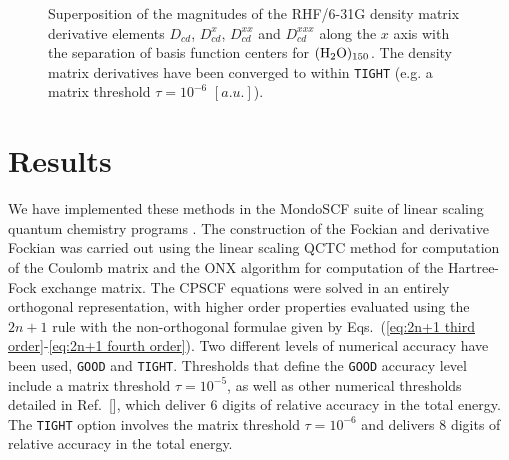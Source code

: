 \documentclass[prl,aps,preprint,showpacs,superbib]{revtex4}
\begin{document}
{\begin{figure}[t]
  \caption{\protect
    Superposition of the magnitudes of the RHF/6-31G density matrix
    derivative elements $D_{cd}$, $D^{x}_{cd}$, $D^{xx}_{cd}$ and $D^{xxx}_{cd}$
    along the $x$ axis with the separation of basis function centers
    for $\rm (H_2O)_{150}$. The density matrix 
    derivatives have been converged to within {\tt TIGHT} (e.g. 
    a matrix threshold $\tau=10^{-6}$ $[a.u.]$).
  }\label{fig:Superposition_Decay}
\end{figure}

}

\section{Results} \label{RESULTS}

We have implemented these methods in the MondoSCF suite of linear scaling quantum chemistry 
programs \cite{MondoSCF}.  The construction of the Fockian and derivative Fockian was carried
out using the linear scaling QCTC method for computation of the Coulomb matrix \cite{MChallacombe97,CTymczak04a} and the
ONX algorithm \cite{ESchwegler97,CTymczak04b} for computation of the Hartree-Fock exchange matrix. 
The CPSCF equations were solved in an entirely orthogonal representation,
with higher order properties evaluated using the $2 n+1$ rule with the non-orthogonal formulae given
by Eqs.~(\ref{eq:2n+1 third order}-\ref{eq:2n+1 fourth order}).  Two different levels of numerical 
accuracy have been used, {\tt GOOD} and {\tt TIGHT}.   Thresholds that define the {\tt GOOD} 
accuracy level include a matrix threshold $\tau=10^{-5}$, as well as other numerical thresholds 
detailed in Ref.~[], which deliver 6 digits of relative accuracy in the total 
energy.  The {\tt TIGHT} option involves the matrix threshold $\tau=10^{-6}$ and delivers 8 
digits of relative accuracy in the total energy.  
\end{document}
